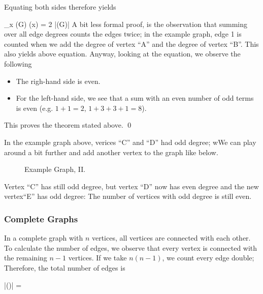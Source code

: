 Equating both sides therefore yields

\bee
\sum_{x \in \Vc(G)} \deg(x) = 2 |\Ec(G)|
\eee
%
A bit less formal proof, is the observation that summing over all edge degrees counts the edges twice; in the example graph, edge 1 is counted when we add the degree of vertex ``A'' and the degree of vertex ``B''. This also yields above equation.
%
Anyway, looking at the equation, we observe the following

\begin{itemize}

\item The righ-hand side is even.

\item For the left-hand side, we see that a sum with an even number of odd terms is even (e.g. $1 + 1 = 2$, $1+3+3+1 = 8$).
  
\end{itemize}

This proves the theorem stated above. \qed

In the example graph above, verices ``C'' and ``D'' had odd degree; wWe can play around a bit further and add another vertex to the graph like below.

\begin{figure}[H]
\centering
{}
\caption{Example Graph, II.}
\end{figure}

Vertex ``C'' has still odd degree, but vertex ``D'' now has even degree and the new vertex``E'' has odd degree: The number of vertices with odd degree is still even.


\subsubsection{Complete Graphs}

In a complete graph with $n$ vertices, all vertices are connected with each other. To calculate the number of edges, we observe that every vertex is connected with the remaining $n-1$ vertices. If we take $n(n-1)$, we count every edge double; Therefore, the total number of edges is

\bee
|\Ec(\Gc)| = 
\eee

